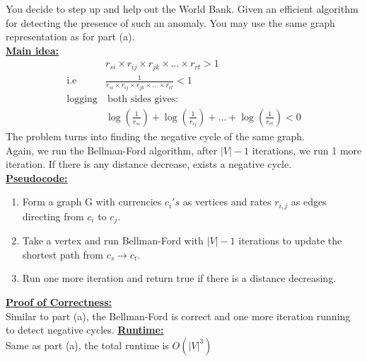 \documentclass{article}\usepackage[utf8]{inputenc}
\begin{document}
\begin{enumerate}[(a)]
You decide to step up and help out the World Bank. Given an efficient algorithm for detecting the presence of such an anomaly. You may use the same graph representation as for part (a).
\BeginSolution %
\\
\underline{\textbf{Main idea:}}
%
\begin{align*}
&r_{si}\times r_{ij}\times r_{jk}\times\dots\times r_{rt} > 1 \\
\text{i.e}\quad &\frac{1}{r_{si}\times r_{ij}\times r_{jk}\times\dots\times r_{rt}} < 1\\
\text{logging}&\ \text{both sides gives:} \\
&\log\left(\frac{1}{r_{si}}\right) + \log\left(\frac{1}{r_{ij}}\right) + \dots + \log\left(\frac{1}{r_{rt}}\right) < 0
\end{align*}
%
The problem turns into finding the negative cycle of the same graph.\\
Again, we run the Bellman-Ford algorithm, after $\vert V\vert - 1$ iterations, we run 1 more iteration. If there is any distance decrease, exists a negative cycle.\\
\underline{\textbf{Pseudocode:}}
%
\begin{enumerate}[1.]
	\item Form a graph G with currencies $c_i's$ as vertices and rates $r_{i,j}$ as edges directing from $c_i$ to $c_j$.
	\item Take a vertex and run Bellman-Ford with $\vert V\vert - 1$ iterations to update the shortest path from $c_s\rightarrow c_t$.
	\item Run one more iteration and return true if there is a distance decreasing.
\end{enumerate}
%
\underline{\textbf{Proof of Correctness:}}\\
Similar to part (a), the Bellman-Ford is correct and one more iteration running to detect negative cycles.
\underline{\textbf{Runtime:}}\\
Same as part (a), the total runtime is $O\left(\vert V\vert^3\right)$
\EndSolution
\end{enumerate}
\clearpage
\end{document}
